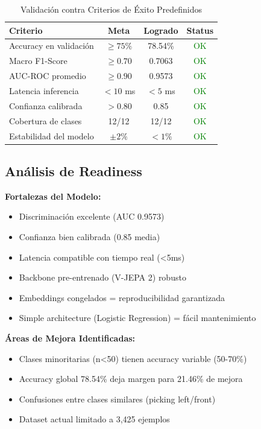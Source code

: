 \documentclass[11pt,letterpaper]{article}
\begin{document}
\begin{table}[H]
\centering
\caption{Validación contra Criterios de Éxito Predefinidos}
\begin{tabular}{|l|c|c|c|}
\hline
\textbf{Criterio} & \textbf{Meta} & \textbf{Logrado} & \textbf{Status} \\
\hline
Accuracy en validación & $\geq 75\%$ & 78.54\% & \textcolor{green}{OK} \\
\hline
Macro F1-Score & $\geq 0.70$ & 0.7063 & \textcolor{green}{OK} \\
\hline
AUC-ROC promedio & $\geq 0.90$ & 0.9573 & \textcolor{green}{OK} \\
\hline
Latencia inferencia & $< 10$ ms & $< 5$ ms & \textcolor{green}{OK} \\
\hline
Confianza calibrada & $> 0.80$ & 0.85 & \textcolor{green}{OK} \\
\hline
Cobertura de clases & 12/12 & 12/12 & \textcolor{green}{OK} \\
\hline
Estabilidad del modelo & $\pm 2\%$ & $<1\%$ & \textcolor{green}{OK} \\
\hline
\end{tabular}
\end{table}

\subsection{Análisis de Readiness}

\textbf{Fortalezas del Modelo:}
\begin{itemize}
  \item Discriminación excelente (AUC 0.9573)
  \item Confianza bien calibrada (0.85 media)
  \item Latencia compatible con tiempo real (<5ms)
  \item Backbone pre-entrenado (V-JEPA 2) robusto
  \item Embeddings congelados = reproducibilidad garantizada
  \item Simple architecture (Logistic Regression) = fácil mantenimiento
\end{itemize}

\textbf{Áreas de Mejora Identificadas:}
\begin{itemize}
  \item Clases minoritarias (n<50) tienen accuracy variable (50-70\%)
  \item Accuracy global 78.54\% deja margen para 21.46\% de mejora
  \item Confusiones entre clases similares (picking left/front)
  \item Dataset actual limitado a 3,425 ejemplos
\end{itemize}
\end{document}
